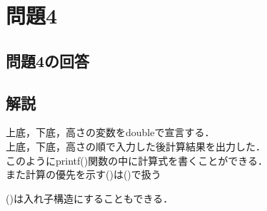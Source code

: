 \documentclass[a4j,titlepage,dvipdfmx]{jsarticle}   %
\newcommand{\codepath}{./code/01_Answer}
\begin{document}
\section{問題4}
\subsection{問題4の回答}

\subsection{解説}
上底，下底，高さの変数をdoubleで宣言する．\\
上底，下底，高さの順で入力した後計算結果を出力した．\\

このようにprintf()関数の中に計算式を書くことができる．\\
また計算の優先を示す()は()で扱う

()は入れ子構造にすることもできる．\\
\end{document}
